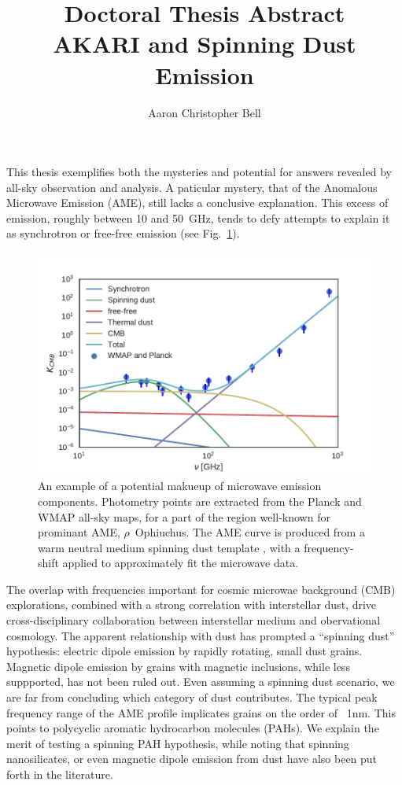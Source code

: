 \documentclass[12pt,a4paper]{article}
\title{Doctoral Thesis Abstract\\
AKARI and Spinning Dust Emission\\
}
\author{Aaron Christopher Bell}
\begin{document}
\maketitle

This thesis exemplifies both the mysteries and potential for answers revealed by all-sky observation and analysis. A paticular mystery, that of the Anomalous Microwave Emission (AME), still lacks a conclusive explanation.  This excess of emission, roughly between 10 and 50~GHz, tends to defy attempts to explain it as synchrotron or free-free emission (see Fig.~\ref{fig:mw_foregrounds_demo_rOph}).
      \begin{figure}[h]
        \centering
        \includegraphics[width=\textwidth/2]{../Plots/ch_intro/mw_foregrounds_demo_rOph.pdf}
          \caption{\small An example of a potential makueup of microwave emission components. Photometry points are extracted from the Planck and WMAP all-sky maps, for a part of the region well-known for prominant AME, $\rho$~Ophiuchus. The AME curve is produced from a warm neutral medium spinning dust template \citep{ali-haimoud09}, with a frequency-shift applied to approximately fit the microwave data.}
        \label{fig:mw_foregrounds_demo_rOph}
      \end{figure}
The overlap with frequencies important for cosmic microwae background (CMB) explorations, combined with a strong correlation with interstellar dust, drive cross-disciplinary collaboration between interstellar medium and obervational cosmology. The apparent relationship with dust has prompted a ``spinning dust'' hypothesis:  electric dipole emission by rapidly rotating, small dust grains. Magnetic dipole emission by grains with magnetic inclusions, while less suppported, has not been ruled out. Even assuming a spinning dust scenario, we are far from concluding which category of dust contributes. The typical peak frequency range of the AME profile implicates grains on the order of ~1nm. This points to polycyclic aromatic hydrocarbon molecules (PAHs). We explain the merit of testing a spinning PAH hypothesis, while noting that spinning nanosilicates, or even magnetic dipole emission from dust have also been put forth in the literature.
\end{document}

